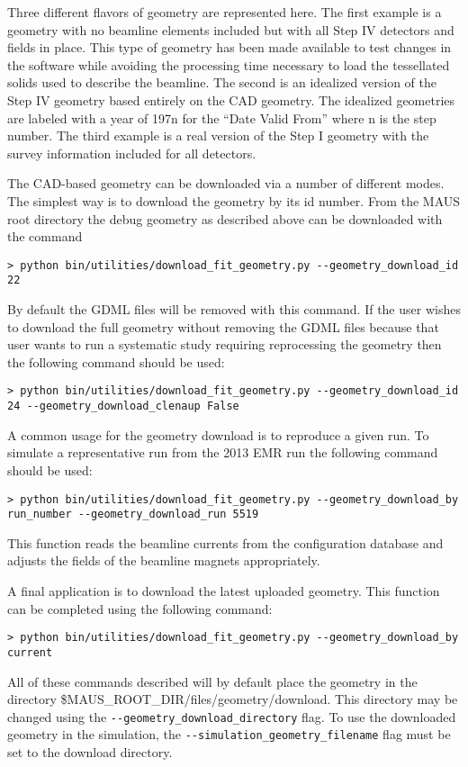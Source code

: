Three different flavors of geometry are represented here. The first
example is a geometry with no beamline elements included but with all
Step IV detectors and fields in place. This type of geometry has been
made available to test changes in the software while avoiding the
processing time necessary to load the tessellated solids used to
describe the beamline. The second is an idealized version of the Step
IV geometry based entirely on the CAD geometry. The idealized
geometries are labeled with a year of 197n for the ``Date Valid
From'' where n is the step number. The third example is a real version
of the Step I geometry with the survey information included for all
detectors.

The CAD-based geometry can be downloaded via a number of different
modes. The simplest way is to download the geometry by its id
number. From the MAUS root directory the debug geometry as described
above can be downloaded with the command
\begin{verbatim}
> python bin/utilities/download_fit_geometry.py --geometry_download_id 22
\end{verbatim}
By default the GDML files will be removed with this command. If the
user wishes to download the full geometry without removing the GDML
files because that user wants to run a systematic study requiring
reprocessing the geometry then the following command should be used:
\begin{verbatim}
> python bin/utilities/download_fit_geometry.py --geometry_download_id 24 --geometry_download_clenaup False
\end{verbatim}

A common usage for the geometry download is to reproduce a given
run. To simulate a representative run from the 2013 EMR run the
following command should be used:
\begin{verbatim}
> python bin/utilities/download_fit_geometry.py --geometry_download_by run_number --geometry_download_run 5519
\end{verbatim}
This function reads the beamline currents from the configuration
database and adjusts the fields of the beamline magnets appropriately.

A final application is to download the latest uploaded geometry. This
function can be completed using the following command:
\begin{verbatim}
> python bin/utilities/download_fit_geometry.py --geometry_download_by current
\end{verbatim}
All of these commands described will by default place the geometry in
the directory \${MAUS_ROOT_DIR}/files/geometry/download. This
directory may be changed using the
\verb+--geometry_download_directory+ flag. To use the downloaded
geometry in the simulation, the \verb+--simulation_geometry_filename+
flag must be set to the download directory. 
